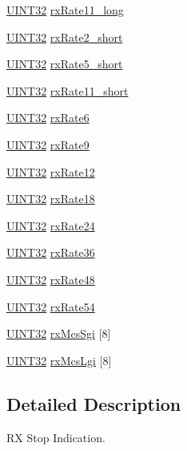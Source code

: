 \begin{DoxyCompactItemize}
\item 
\hyperlink{a00660_gae1e6edbbc26d6fbc71a90190d0266018}{UINT32} \hyperlink{a00419_aaca42bfc086b7050ceb653bdc72eb65a}{rxRate11\_\-long}
\item 
\hyperlink{a00660_gae1e6edbbc26d6fbc71a90190d0266018}{UINT32} \hyperlink{a00419_a5c988a8eef022740b4c0145646a9ef5b}{rxRate2\_\-short}
\item 
\hyperlink{a00660_gae1e6edbbc26d6fbc71a90190d0266018}{UINT32} \hyperlink{a00419_a39494e501e6828fd3c67e9ccb82b1b3b}{rxRate5\_\-short}
\item 
\hyperlink{a00660_gae1e6edbbc26d6fbc71a90190d0266018}{UINT32} \hyperlink{a00419_a0fb6f762bc2dc057b652e525d740627c}{rxRate11\_\-short}
\item 
\hyperlink{a00660_gae1e6edbbc26d6fbc71a90190d0266018}{UINT32} \hyperlink{a00419_a426acaa47c821b3bb40f4433ca92039c}{rxRate6}
\item 
\hyperlink{a00660_gae1e6edbbc26d6fbc71a90190d0266018}{UINT32} \hyperlink{a00419_a1ab6b1ab905665c0ffb80d34860981bb}{rxRate9}
\item 
\hyperlink{a00660_gae1e6edbbc26d6fbc71a90190d0266018}{UINT32} \hyperlink{a00419_a9bbaff40dace9b5651e89b06c6f52ced}{rxRate12}
\item 
\hyperlink{a00660_gae1e6edbbc26d6fbc71a90190d0266018}{UINT32} \hyperlink{a00419_a0b48a9e05659fc40079cf212cf2501b6}{rxRate18}
\item 
\hyperlink{a00660_gae1e6edbbc26d6fbc71a90190d0266018}{UINT32} \hyperlink{a00419_acb883d5793f4e20ab36b0f5a08575eac}{rxRate24}
\item 
\hyperlink{a00660_gae1e6edbbc26d6fbc71a90190d0266018}{UINT32} \hyperlink{a00419_a979cd4d132b50b48b8e739232ebbb5a8}{rxRate36}
\item 
\hyperlink{a00660_gae1e6edbbc26d6fbc71a90190d0266018}{UINT32} \hyperlink{a00419_a59664069949e7b8e26a8be0972f49807}{rxRate48}
\item 
\hyperlink{a00660_gae1e6edbbc26d6fbc71a90190d0266018}{UINT32} \hyperlink{a00419_ab4c8a5c19599e0b23c31964efa3570af}{rxRate54}
\item 
\hyperlink{a00660_gae1e6edbbc26d6fbc71a90190d0266018}{UINT32} \hyperlink{a00419_a778a7aadda15a017df57abcdb77f2c04}{rxMcsSgi} \mbox{[}8\mbox{]}
\item 
\hyperlink{a00660_gae1e6edbbc26d6fbc71a90190d0266018}{UINT32} \hyperlink{a00419_a8747c8baeced4da14ebab28d32c0d86a}{rxMcsLgi} \mbox{[}8\mbox{]}
\end{DoxyCompactItemize}


\subsection{Detailed Description}
RX Stop Indication. 

